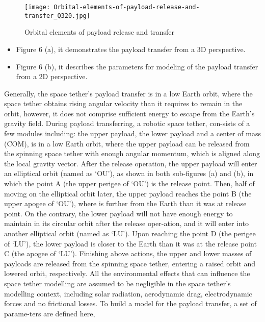 \documentclass[conference]{IEEEtran}
\begin{document}
\begin{figure}[H]
\centering
\begin{minipage}{0.4\textwidth}
    \texttt{[image: Orbital-elements-of-payload-release-and-transfer\_Q320.jpg]}
    \caption{Orbital elements of payload release and transfer}
\end{minipage}
\end{figure}
\begin{itemize}
    \item Figure 6 (a), it demonstrates the payload transfer from a
3D perspective.
    \item Figure 6 (b), it describes the parameters for modeling of
the payload transfer from a 2D perspective.
\end{itemize}
Generally, the space tether's payload transfer is in a low
Earth orbit, where the space tether obtains rising angular
velocity than it requires to remain in the orbit, however, it does
not comprise sufficient energy to escape from the Earth's
gravity field.
During payload transferring, a robotic space tether, con-sists of a few modules including: the upper payload, the lower
payload and a center of mass (COM), is in a low Earth
orbit, where the upper payload can be released from the
spinning space tether with enough angular momentum, which
is aligned along the local gravity vector.
After the release operation, the upper payload will enter an
elliptical orbit (named as `OU'), as shown in both sub-figures
(a) and (b), in which the point A (the upper perigee of `OU')
is the release point. Then, half of moving on the elliptical orbit
later, the upper payload reaches the point B (the upper apogee
of `OU'), where is further from the Earth than it was at release
point.
On the contrary, the lower payload will not have enough
energy to maintain in its circular orbit after the release oper-ation, and it will enter into another elliptical orbit (named
as `LU'). Upon reaching the point D (the perigee of `LU'),
the lower payload is closer to the Earth than it was at the
release point C (the apogee of `LU').
Finishing above actions, the upper and lower masses of
payloads are released from the spinning space tether, entering
a raised orbit and lowered orbit, respectively.
All the environmental effects that can influence the
space tether modelling are assumed to be negligible in the
space tether's modelling context, including solar radiation,
aerodynamic drag, electrodynamic forces and no frictional
losses.
To build a model for the payload transfer, a set of parame-ters are defined here,
\end{document}
